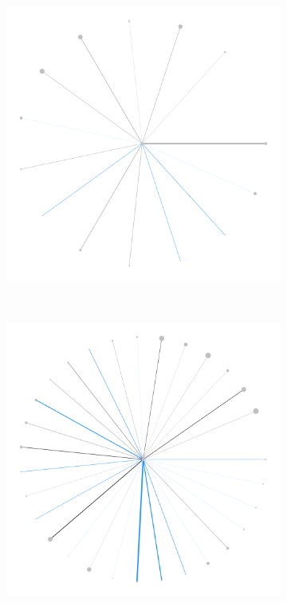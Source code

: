 \documentclass[varwidth, border=0pt]{standalone}
\begin{document}
			\vspace*{-20pt}\begin{figure}
				\centering
				\vspace*{-3pt}\caption*{\textbf{\sffamily(b)}\quad Responsibility}
			\vspace*{-2pt}\begin{subfigure}{0.24\linewidth}
				\centering
				\includegraphics[width=\linewidth]{../../graphics/evolution/responsibility-de-wphg-1998.pdf}%
				\vspace*{3pt}
			\end{subfigure}~%
			\begin{subfigure}{0.24\linewidth}
				\centering
				\includegraphics[width=\linewidth]{../../graphics/evolution/responsibility-de-wphg-2005.pdf}%

\end{subfigure}
\end{figure}
\end{document}

